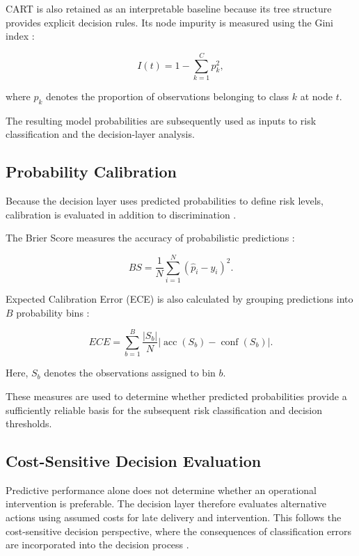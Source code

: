 \documentclass[manuscript, screen, review]{acmart}
\begin{document}
CART is also retained as an interpretable baseline because its tree
structure provides explicit decision rules. Its node impurity is
measured using the Gini index \cite{breiman1984classification}:

\begin{equation}
I(t)=1-\sum_{k=1}^{C}p_k^2,
\end{equation}

where $p_k$ denotes the proportion of observations belonging to class
$k$ at node $t$.

The resulting model probabilities are subsequently used as inputs to
risk classification and the decision-layer analysis.

\subsection{Probability Calibration}

Because the decision layer uses predicted probabilities to define risk
levels, calibration is evaluated in addition to discrimination
\cite{niculescu2005predicting,guo2017calibration}.

The Brier Score measures the accuracy of probabilistic predictions
\cite{brier1950verification}:

\begin{equation}
BS=\frac{1}{N}\sum_{i=1}^{N}(\hat{p}_i-y_i)^2.
\end{equation}

Expected Calibration Error (ECE) is also calculated by grouping
predictions into $B$ probability bins
\cite{naeini2015obtaining,guo2017calibration}:

\begin{equation}
ECE=
\sum_{b=1}^{B}
\frac{|S_b|}{N}
\left|
\operatorname{acc}(S_b)
-
\operatorname{conf}(S_b)
\right|.
\end{equation}

Here, $S_b$ denotes the observations assigned to bin $b$.

These measures are used to determine whether predicted probabilities
provide a sufficiently reliable basis for the subsequent risk
classification and decision thresholds.

\subsection{Cost-Sensitive Decision Evaluation}

Predictive performance alone does not determine whether an operational
intervention is preferable. The decision layer therefore evaluates
alternative actions using assumed costs for late delivery and
intervention. This follows the cost-sensitive decision perspective,
where the consequences of classification errors are incorporated into
the decision process \cite{elkan2001foundations}.
\end{document}
